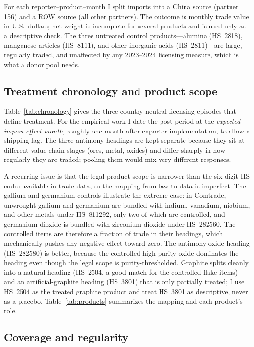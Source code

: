 \documentclass[12pt,a4paper]{article}
\begin{document}
For each reporter--product--month I split imports into a China source (partner
156) and a ROW source (all other partners). The outcome is monthly trade value
in U.S.\ dollars; net weight is incomplete for several products and is used only
as a descriptive check. The three untreated control products---alumina
(HS~2818), manganese articles (HS~8111), and other inorganic acids (HS~2811)---are
large, regularly traded, and unaffected by any 2023--2024 licensing measure,
which is what a donor pool needs.

\subsection{Treatment chronology and product scope}\label{sec:chronology}

Table~\ref{tab:chronology} gives the three country-neutral licensing episodes
that define treatment. For the empirical work I date the post-period at the
\emph{expected import-effect month}, roughly one month after exporter
implementation, to allow a shipping lag. The three antimony headings are kept
separate because they sit at different value-chain stages (ores, metal, oxides)
and differ sharply in how regularly they are traded; pooling them would mix very
different responses.

A recurring issue is that the legal product scope is narrower than the
six-digit HS codes available in trade data, so the mapping from law to data is
imperfect. The gallium and germanium controls illustrate the extreme case: in
Comtrade, unwrought gallium and germanium are bundled with indium, vanadium,
niobium, and other metals under HS~811292, only two of which are controlled, and germanium dioxide
is bundled with zirconium dioxide under HS~282560. The controlled items are
therefore a fraction of trade in their headings, which mechanically pushes any
negative effect toward zero. The antimony oxide heading (HS~282580) is better,
because the controlled high-purity oxide dominates the heading even though the
legal scope is purity-thresholded. Graphite splits cleanly into a natural
heading (HS~2504, a good match for the controlled flake items) and an
artificial-graphite heading (HS~3801) that is only partially treated; I use
HS~2504 as the treated graphite product and treat HS~3801 as descriptive, never
as a placebo. Table~\ref{tab:products} summarizes the mapping and each
product's role.




\subsection{Coverage and regularity}\label{sec:coverage}
\end{document}

